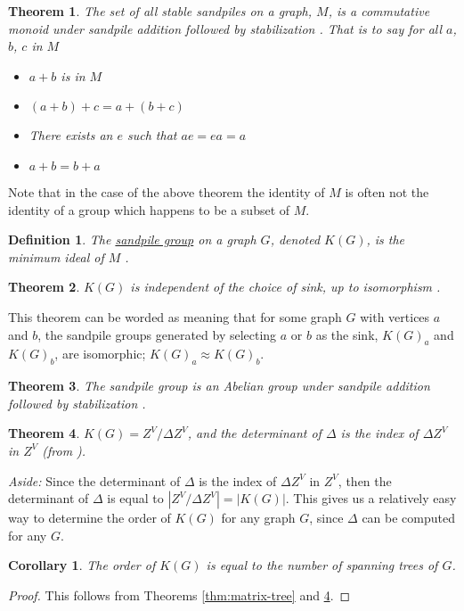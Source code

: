 \documentclass[12pt]{article}
\newtheorem{theorem}{Theorem}
\newtheorem{corollary}{Corollary}
\newtheorem{definition}{Definition}
\begin{document}
\begin{theorem}
    The set of all stable sandpiles on a graph, $M$, is a commutative monoid under sandpile addition followed by stabilization \cite{levine}.  That is to say for all $a$, $b$, $c$ in $M$
    \begin{itemize}
        \item $a+b$ is in $M$
        \item $(a+b)+c=a+(b+c)$
        \item There exists an $e$ such that $ae=ea=a$
        \item $a+b = b+a$
    \end{itemize}
\end{theorem}
Note that in the case of the above theorem the identity of $M$ is often not the identity of a group which happens to be a subset of $M$.
\begin{definition}
    The \underline{sandpile group} on a graph $G$, denoted $K(G)$, is the minimum ideal of $M$ \cite{levine}.
\end{definition}

\begin{theorem} \label{thm:independent}
    $K(G)$ is independent of the choice of sink, up to isomorphism \cite{levine}.
\end{theorem}
This theorem can be worded as meaning that for some graph $G$ with vertices $a$ and $b$, the sandpile groups generated by selecting $a$ or $b$ as the sink, $K(G)_a$ and $K(G)_b$, are isomorphic; $K(G)_a \approx K(G)_b$. 
\begin{theorem}
    The sandpile group is an Abelian group under sandpile addition followed by stabilization \cite{levine}.
    \label{thm:ideal}
\end{theorem}

\begin{theorem}
    $K(G) = Z^V/\Delta Z^V$, and the determinant of $\Delta$ is the index of $\Delta Z^V$ in $Z^V$ (from \cite{levine}).
    \label{thm:zvmod}
\end{theorem}
\textit{Aside:}  Since the determinant of $\Delta$ is the index of $\Delta Z^V$ in $Z^V$, then the determinant of $\Delta$ is equal to $|Z^V/\Delta Z^V| = |K(G)|$.  This gives us a relatively easy way to determine the order of $K(G)$ for any graph $G$, since $\Delta$ can be computed for any $G$.

\begin{corollary} \label{c:order}
    The order of $K(G)$ is equal to the number of spanning trees of $G$.
\end{corollary}
\begin{proof}
    This follows from Theorems \ref{thm:matrix-tree} and \ref{thm:zvmod}.
\end{proof}
\end{document}
